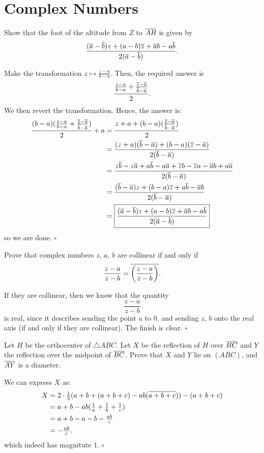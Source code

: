 \documentclass{article}
\begin{document}
\newpage

\section{Complex Numbers}

\begin{problem}[6.3]{}
Show that the foot of the altitude from $Z$ to $\overline{AB}$ is given by \[\dfrac{(\overline{a}-\overline{b})z+(a-b)\overline{z}+\overline{a}b-a\overline{b}}{2(\overline{a}-\overline{b})}.\]
\end{problem}

Make the transformation $z \mapsto \tfrac{z-a}{b-a}$. Then, the required answer is \[\dfrac{\tfrac{z-a}{b-a} + \tfrac{\overline{z}-\overline{a}}{\overline{b}-\overline{a}}}{2}.\] We then revert the transformation. Hence, the answer is:
\begin{align*}
\dfrac{(b-a)(\tfrac{z-a}{b-a} + \tfrac{\overline{z}-\overline{a}}{\overline{b}-\overline{a}})}{2}+a &= \dfrac{z+a+(b-a)(\tfrac{\overline{z}-\overline{a}}{\overline{b}-\overline{a}})}{2} \\
&= \dfrac{(z+a)(\overline{b}-\overline{a})+(b-a)(\overline{z}-\overline{a})}{2(\overline{b}-\overline{a})} \\
&= \dfrac{z\overline{b}-z\overline{a}+a\overline{b}-a\overline{a}+\overline{z}b-\overline{z}a-\overline{a}b+a\overline{a}}{2(\overline{b}-\overline{a})} \\
&= \dfrac{(\overline{b}-\overline{a})z+(b-a)\overline{z}+a\overline{b}-\overline{a}b}{2(\overline{b}-\overline{a})} \\
&= \boxed{\dfrac{(\overline{a}-\overline{b})z+(a-b)\overline{z}+\overline{a}b-a\overline{b}}{2(\overline{a}-\overline{b})}} \\
\end{align*}
so we are done. $\square$

\begin{problem}[6.8]{}
Prove that complex numbers $z$, $a$, $b$ are collinear if and only if \[\dfrac{z - a}{z - b} = \overline{\left(\dfrac{z - a}{z - b}\right)}.\]
\end{problem}

If they are collinear, then we know that the quantity \[\dfrac{z-a}{z-b}\] is real, since it describes sending the point $a$ to $0$, and sending $z$, $b$ onto the real axis (if and only if they are collinear). The finish is clear. $\square$

\begin{problem}[6.14]{}
Let $H$ be the orthocenter of $\triangle ABC$. Let $X$ be the reflection of $H$ over $\overline{BC}$ and $Y$ the reflection over the midpoint of $\overline{BC}$. Prove that $X$ and $Y$ lie on $(ABC)$, and $\overline{AY}$ is a diameter.
\end{problem}

We can express $X$ as: 
\begin{align*}
X &= 2\cdot \tfrac{1}{2}(a+b+(a+b+c)-ab(\overline{a+b+c}))-(a+b+c) \\
&= a+b-ab(\tfrac{1}{a}+\tfrac{1}{b}+\tfrac{1}{c}) \\
&= a+b-a-b-\tfrac{ab}{c} \\
&= -\tfrac{ab}{c}.
\end{align*}
which indeed has magnitute $1$. $\square$
\end{document}
